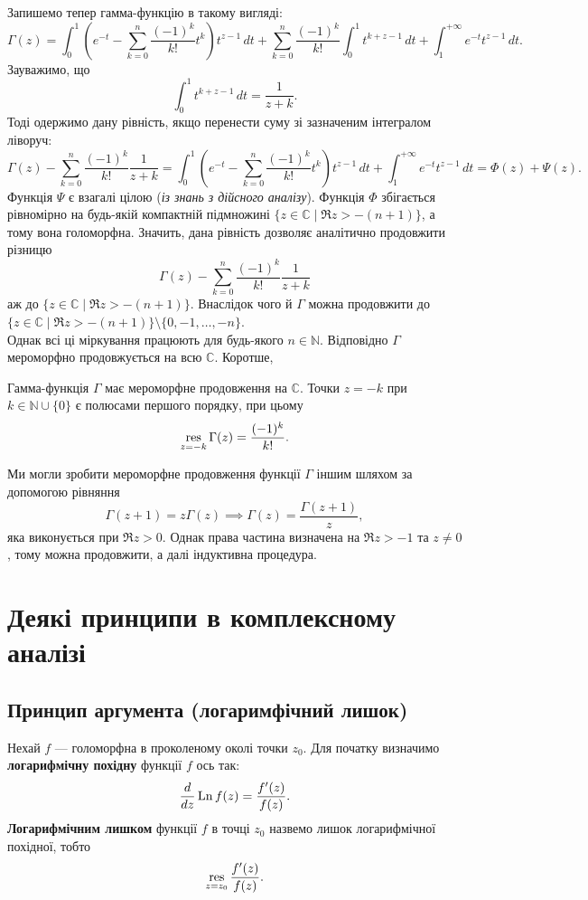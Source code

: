 \documentclass{math_library}
\begin{document}
Запишемо тепер гамма-функцію в такому вигляді:
\[
\Gamma(z) = \int_0^1 \left( e^{-t} - \sum_{k=0}^n \dfrac{(-1)^k}{k!} t^k \right) t^{z-1}\,dt + \sum_{k=0}^n \dfrac{(-1)^k}{k!} \int_0^1 t^{k+z-1}\,dt + \int_{1}^{+\infty} e^{-t}t^{z-1}\,dt.
\]
Зауважимо, що
\[
\int_0^1 t^{k+z-1}\,dt = \dfrac{1}{z+k}.
\]
Тоді одержимо дану рівність, якщо перенести суму зі зазначеним інтегралом ліворуч:
\[
\Gamma(z) - \sum_{k=0}^n \dfrac{(-1)^k}{k!} \dfrac{1}{z+k} = \int_0^1 \left( e^{-t} - \sum_{k=0}^n \dfrac{(-1)^k}{k!} t^k \right) t^{z-1}\,dt + \int_{1}^{+\infty} e^{-t}t^{z-1}\,dt = \Phi(z) + \Psi(z).
\]
Функція $\Psi$ є взагалі цілою (\textit{із знань з дійсного аналізу}). Функція $\Phi$ збігається рівномірно на будь-якій компактній підмножині $\{ z \in \mathbb{C} \mid \Re z > -(n+1)\}$, а тому вона голоморфна. Значить, дана рівність дозволяє аналітично продовжити різницю
\[
\Gamma(z) - \sum_{k=0}^n \dfrac{(-1)^k}{k!} \dfrac{1}{z+k}
\]
аж до $\{ z \in \mathbb{C} \mid \Re z > -(n+1)\}$. Внаслідок чого й $\Gamma$ можна продовжити до $\{ z \in \mathbb{C} \mid \Re z > -(n+1)\} \setminus \{0,-1,\dots,-n\}$.\\
Однак всі ці міркування працюють для будь-якого $n \in \mathbb{N}$. Відповідно $\Gamma$ мероморфно продовжується на всю $\mathbb{C}$. Коротше,

\begin{proposition}
Гамма-функція $\Gamma$ має мероморфне продовження на $\mathbb{C}$. Точки $z = -k$ при $k \in \mathbb{N} \cup \{0\}$ є полюсами першого порядку, при цьому
\begin{align*}
\operatorname*{res}_{z = -k} \Gamma(z) = \dfrac{(-1)^k}{k!}.
\end{align*}
\end{proposition}

\begin{remark}
Ми могли зробити мероморфне продовження функції $\Gamma$ іншим шляхом за допомогою рівняння
\[
\Gamma(z+1) = z \Gamma(z) \implies \Gamma(z) = \dfrac{\Gamma(z+1)}{z},
\]
яка виконується при $\Re z > 0$. Однак права частина визначена на $\Re z > -1$ та $z \neq 0$, тому можна продовжити, а далі індуктивна процедура.
\end{remark}
\newpage


\section{Деякі принципи в комплексному аналізі}
\subsection{Принцип аргумента (логаримфічний лишок)}
\begin{definition}
Нехай $f$ --- голоморфна в проколеному околі точки $z_0$. Для початку визначимо \textbf{логарифмічну похідну} функції $f$ ось так:
\begin{align*}
\dfrac{d}{dz} \operatorname{Ln} f(z) = \dfrac{f'(z)}{f(z)}.
\end{align*}
\textbf{Логарифмічним лишком} функції $f$ в точці $z_0$ назвемо лишок логарифмічної похідної, тобто
\begin{align*}
\operatorname*{res}_{z = z_0} \dfrac{f'(z)}{f(z)}.
\end{align*}
\end{definition}
\end{document}
